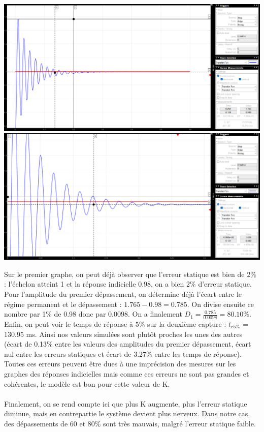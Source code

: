 \documentclass[12pt]{article}
\begin{document}
\begin{center}
    \includegraphics[width = 16 cm]{TP2 Simulink/Syst_2/depassement_4_1_K=24.5.png}
    \includegraphics[width = 16 cm]{TP2 Simulink/Syst_2/tr5prct_4.1_K=24.5.png}
\end{center}
    Sur le premier graphe, on peut déjà observer que l'erreur statique est bien de 2$\%$ : l'échelon atteint 1 et la réponse indicielle 0.98, on a bien 2$\%$ d'erreur statique.
    Pour l'amplitude du premier dépassement, on détermine déjà l'écart entre le régime permanent et le dépassement : $1.765 -0.98 = 0.785$. On divise ensuite ce nombre par 1$\%$ de 0.98 donc par 0.0098.
    On a finalement $D_1 = \frac{0.785}{0.0098} = 80.10\%$. Enfin, on peut voir le temps de réponse à 5$\%$ sur la deuxième capture : $t_{r5\%}$ = 130.95 ms.
    Ainsi nos valeurs simulées sont plutôt proches les unes des autres (écart de 0.13$\%$ entre les valeurs des amplitudes du premier dépassement, écart nul entre les erreurs statiques et écart de 3.27$\%$ entre les temps de réponse). Toutes ces erreurs peuvent être dues à une imprécision des mesures sur les graphes des réponses indicielles mais comme ces erreurs ne sont pas grandes et cohérentes, le modèle est bon pour cette valeur de K.
    \\\\Finalement, on se rend compte ici que plus K augmente, plus l'erreur statique diminue, mais en contrepartie le système devient plus nerveux. Dans notre cas, des dépassements de 60 et 80$\%$ sont très mauvais, malgré l'erreur statique faible.
\end{document}
